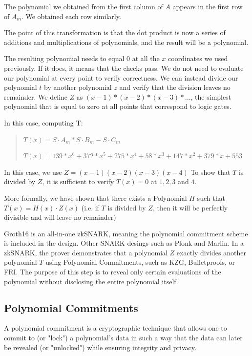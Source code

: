 The polynomial we obtained from the first column of $A$ appears in the first row of $A_m$. We obtained each row similarly.

The point of this transformation is that the dot product is now a series of additions and multiplications of polynomials, and the result will be a polynomial.

The resulting polynomial needs to equal $0$ at all the $x$ coordinates we used previously.
If it does, it means that the checks pass.
We do not need to evaluate our polynomial at every point to verify correctness. 
We can instead divide our polynomial $t$ by another polynomial $z$ and verify that the division leaves no remainder.
We define $Z$ as $(x - 1) * (x - 2) * (x - 3) * ...$, the simplest polynomial that is equal to zero at all points that correspond to logic gates. 

In this case, computing T:
\begin{quote}
$T(x) = S \cdot A_m * S \cdot B_m - S \cdot C_m  $

$T(x) = 139*x^6 + 372*x^5 + 275*x^4 + 58*x^3 + 147*x^2 + 379*x + 553$
\end{quote}

In this case, we use $Z = (x-1)(x-2)(x-3)(x-4)$
To show that $T$ is divided by $Z$, it is sufficient to verify $T(x) = 0$ at $1,2,3$ and $4$.

More formally, we have shown that there exists a Polynomial $H$ such that $T(x)=H(x) \cdot Z(x)$
(i.e. if $T$ is divided by $Z$, then it will be perfectly divisible and will leave no remainder)


Groth16 is an all-in-one zkSNARK, meaning the polynomial commitment scheme is included in the design. Other SNARK desings such as Plonk and Marlin.
In a zkSNARK, the prover demonstrates that a polynomial $Z$ exactly divides another polynomial
$T$ using Polynomial Commitments, such as KZG, Bulletproofs, or FRI. 
The purpose of this step is to reveal only certain evaluations of the polynomial without disclosing the entire polynomial itself.\cite{VB16}


\subsection{Polynomial Commitments}
\label{subsec:pc}
A polynomial commitment is a cryptographic technique that allows one to commit to (or "lock") a polynomial's data 
in such a way that the data can later be revealed (or "unlocked") while ensuring integrity and privacy.

